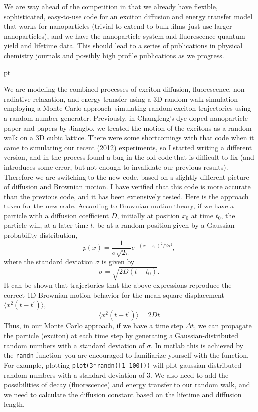 \documentclass[12pt]{article}
\def\vev#1{\langle{#1}\rangle}          %
\begin{document}
We are way ahead of the competition in that we already have flexible,
sophisticated, easy-to-use code for an exciton diffusion and energy
transfer model that works for nanoparticles (trivial to extend to bulk
films--just use larger nanoparticles), and we have the nanoparticle
system and fluorescence quantum yield and lifetime data.  This should
lead to a series of publications in physical chemistry journals and
possibly high profile publications as we progress.

 pt

 \vskip 10pt

\noindent We are modeling the combined processes of exciton diffusion,
fluorescence, non-radiative relaxation, and energy transfer using a 3D
random walk simulation employing a Monte Carlo approach--simulating
random exciton trajectories using a random number generator.
Previously, in Changfeng's dye-doped nanoparticle paper and papers by
Jiangbo, we treated the motion of the excitons as a random walk on a
3D cubic lattice.  There were some shortcomings with that code when it
came to simulating our recent (2012) experiments, so I started writing
a different version, and in the process found a bug in the old code
that is difficult to fix (and introduces some error, but not enough to
invalidate our previous results). Therefore we are switching to the
new code, based on a slightly different picture of diffusion and
Brownian motion.  I have verified that this code is more accurate than
the previous code, and it has been extensively tested.  Here is the
approach taken for the new code.  According to Brownian motion theory,
if we have a particle with a diffusion coefficient $D$, initially at
position $x_0$ at time $t_0$, the particle will, at a later time $t$,
be at a random position given by a Gaussian probability distribution,
%
$$
p(x) = \frac{1}{\sigma \sqrt{2\pi}} e^{-(x-x_0)^2/2 \sigma^2},
$$
%
where the standard deviation $\sigma$ is given by
%
$$
\sigma = \sqrt{2 D (t-t_0)}.
$$
%
It can be shown that trajectories that the above expressions reproduce
the correct 1D Brownian motion behavior for the mean square displacement
$\vev{x^2(t-t^\prime)}$,
%
$$
\vev{x^2(t-t^\prime)} = 2 D t
$$
%
Thus, in our Monte Carlo approach, if we have a time step $\Delta t$,
we can propagate the particle (exciton) at each time step by
generating a Gaussian-distributed random numbers with a standard deviation of
$\sigma$.  In {\sc matlab} this is achieved by the {\tt randn}
function--you are encouraged to familiarize yourself with the
function.  For example, plotting {\tt plot(3*randn([1 100]))} will
plot gaussian-distributed random numbers with a standard deviation of
3.  We also need to add the possibilities of decay (fluorescence) and
energy transfer to our random walk, and we need to calculate the
diffusion constant based on the lifetime and diffusion length.
\end{document}
